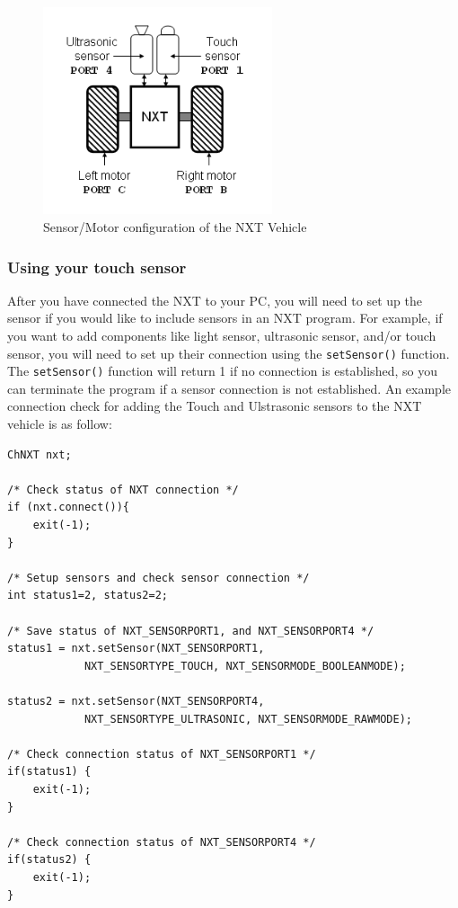 \documentclass[11pt]{article}
\begin{document}
\begin{figure}[H]
  \begin{center}
    \includegraphics[height=2.4in]{figure/mindstorm/NXT_auto.png}
    \caption{Sensor/Motor configuration of the NXT Vehicle \label{fig_NXT_sensport}}
  \end{center}
\end{figure}

\subsubsection{Using your touch sensor}
After you have connected the NXT to your PC, you will need to set up the sensor if you would like to include 
sensors in an NXT program. For example, if you want to add components like light sensor, ultrasonic sensor, 
and/or touch sensor, you will need to set up their connection using the \verb+setSensor()+ function. 
The \verb+setSensor()+ function will return 1 if no connection is established, so you can terminate the 
program if a sensor connection is not established. An example connection check for adding the Touch and 
Ulstrasonic sensors to the NXT vehicle is as follow:
\begin{lstlisting}
ChNXT nxt;

/* Check status of NXT connection */
if (nxt.connect()){
    exit(-1);
}

/* Setup sensors and check sensor connection */
int status1=2, status2=2;

/* Save status of NXT_SENSORPORT1, and NXT_SENSORPORT4 */
status1 = nxt.setSensor(NXT_SENSORPORT1, 
            NXT_SENSORTYPE_TOUCH, NXT_SENSORMODE_BOOLEANMODE);

status2 = nxt.setSensor(NXT_SENSORPORT4,
            NXT_SENSORTYPE_ULTRASONIC, NXT_SENSORMODE_RAWMODE);
    
/* Check connection status of NXT_SENSORPORT1 */
if(status1) {
    exit(-1);
}
    
/* Check connection status of NXT_SENSORPORT4 */
if(status2) {
    exit(-1);
}
\end{lstlisting}
\end{document}
